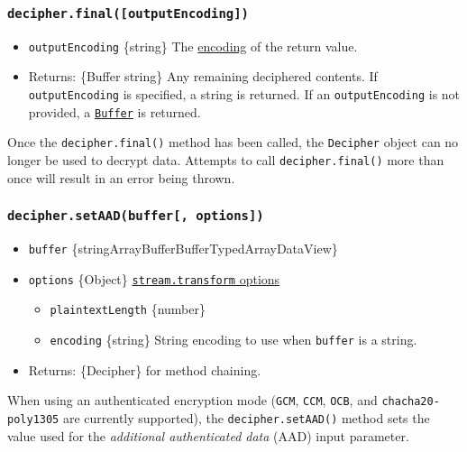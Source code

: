 \subsubsection{\texorpdfstring{\texttt{decipher.final({[}outputEncoding{]})}}{decipher.final({[}outputEncoding{]})}}\label{decipher.finaloutputencoding}

\begin{itemize}
\tightlist
\item
  \texttt{outputEncoding} \{string\} The
  \href{buffer.md\#buffers-and-character-encodings}{encoding} of the
  return value.
\item
  Returns: \{Buffer \textbar{} string\} Any remaining deciphered
  contents. If \texttt{outputEncoding} is specified, a string is
  returned. If an \texttt{outputEncoding} is not provided, a
  \href{buffer.md}{\texttt{Buffer}} is returned.
\end{itemize}

Once the \texttt{decipher.final()} method has been called, the
\texttt{Decipher} object can no longer be used to decrypt data. Attempts
to call \texttt{decipher.final()} more than once will result in an error
being thrown.

\subsubsection{\texorpdfstring{\texttt{decipher.setAAD(buffer{[},\ options{]})}}{decipher.setAAD(buffer{[}, options{]})}}\label{decipher.setaadbuffer-options}

\begin{itemize}
\tightlist
\item
  \texttt{buffer}
  \{string\textbar ArrayBuffer\textbar Buffer\textbar TypedArray\textbar DataView\}
\item
  \texttt{options} \{Object\}
  \href{stream.md\#new-streamtransformoptions}{\texttt{stream.transform}
  options}

  \begin{itemize}
  \tightlist
  \item
    \texttt{plaintextLength} \{number\}
  \item
    \texttt{encoding} \{string\} String encoding to use when
    \texttt{buffer} is a string.
  \end{itemize}
\item
  Returns: \{Decipher\} for method chaining.
\end{itemize}

When using an authenticated encryption mode (\texttt{GCM}, \texttt{CCM},
\texttt{OCB}, and \texttt{chacha20-poly1305} are currently supported),
the \texttt{decipher.setAAD()} method sets the value used for the
\emph{additional authenticated data} (AAD) input parameter.

